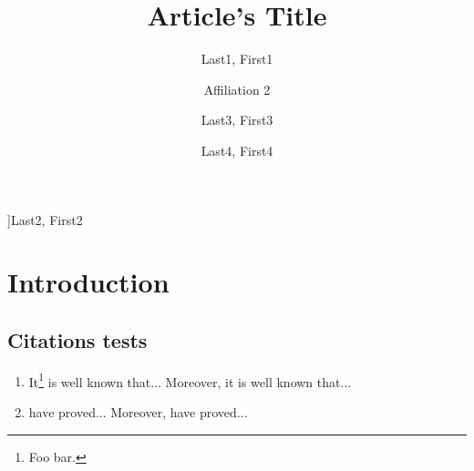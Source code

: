 \documentclass[
]{nwejmart}
\begin{document}
%
\title{Article's Title}
%
%
\author[affiliation={Affiliation 1}]{Last1, First1}
\author[affiliation=[aff2]{Affiliation 2}]{Last2, First2}
\author[affiliation={Affiliation 3},affiliation={Affiliation 3 bis}]{Last3, First3}
\author[affiliation={Affiliation 4},affiliationtagged={aff2}]{Last4, First4}
%
\begin{abstract}
  \lipsum[1]
\end{abstract}
%
%
%
%
%
\maketitle
%
\section*{Introduction}
%
\subsection{Citations tests}
%
\begin{enumerate}
\item It\footnote{Foo bar.} is well known\autocite{baez/article}
  that... Moreover, it is well known\autocite{companion} that...
\item \textcite{baez/article} have proved... Moreover, \textcite{companion}
  have proved...
\end{enumerate}
%
\end{document}
